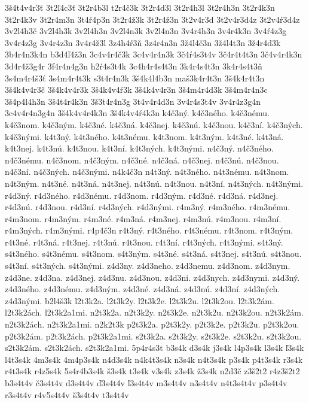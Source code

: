 {3š4t4v4r3ť
3t2ľ4c3ť
3t2r4b3l
t2r4č3k
3t2r4d3l
3t2r4h3l
3t2r4h3n
3t2r4k3n
3t2r4k3v
3t2r4m3n
3t4ŕ4p3n
3t2r4ž3k
3t2r4ž3n
3t2v4r3d
3t2v4r3d4z
3t2v4ŕ3d4z
3v2l4h3č
3v2l4h3k
3v2l4h3n
3v2l4n3k
3v2l4n3n
3v4r4h3n
3v4r4k3n
3v4ŕ4z3g
3v4r4z3g
3v4r4z3n
3v4r4ž3l
3z4h4ŕ3ň
3z4r4n3n
3ž4l4č3n
3ž4l4t3n
3ž4r4d3k
3b4r4n3k4n
b3d4ľ4ž3n
3c4v4r4č3k
3c4v4r4n3k
3č4ŕ4s3t4v
3č4r4t4t3n
3č4v4r4k3n
3d4r4ž3g4r
3f4r4n4g3n
h2ŕ4s3t4k
3c4h4r4s4t3n
3k4r4s4t3n
3k4r4s4t3ň
3s4m4r4š3ť
3s4m4r4t3k
s3t4r4n3k
3š4k4l4b3n
maš3k4r4t3n
3š4k4r4t3n
3š4k4v4r3č
3š4k4v4r3k
3š4k4v4ŕ3k
3š4k4v4r3n
3š4m4r4d3k
3š4m4r4n3c
3š4p4l4h3n
3š4t4r4k3n
3š3t4r4n3g
3t4v4r4d3n
3v4r4s3t4v
3v4r4z3g4n
3c4v4r4n3g4n
3š4k4v4r4k3n
3š4k4v4ŕ4k3n
k4č3ný.
k4č3ného.
k4č3nému.
k4č3nom.
k4č3ným.
k4č3né.
k4č3ná.
k4č3nej.
k4č3nú.
k4č3nou.
k4č3ní.
k4č3ných.
k4č3nými.
k4t3ný.
k4t3ného.
k4t3nému.
k4t3nom.
k4t3ným.
k4t3né.
k4t3ná.
k4t3nej.
k4t3nú.
k4t3nou.
k4t3ní.
k4t3ných.
k4t3nými.
n4č3ný.
n4č3ného.
n4č3nému.
n4č3nom.
n4č3ným.
n4č3né.
n4č3ná.
n4č3nej.
n4č3nú.
n4č3nou.
n4č3ní.
n4č3ných.
n4č3nými.
n4k4č3n
n4t3ný.
n4t3ného.
n4t3nému.
n4t3nom.
n4t3ným.
n4t3né.
n4t3ná.
n4t3nej.
n4t3nú.
n4t3nou.
n4t3ní.
n4t3ných.
n4t3nými.
r4d3ný.
r4d3ného.
r4d3nému.
r4d3nom.
r4d3ným.
r4d3né.
r4d3ná.
r4d3nej.
r4d3nú.
r4d3nou.
r4d3ní.
r4d3ných.
r4d3nými.
r4m3ný.
r4m3ného.
r4m3nému.
r4m3nom.
r4m3ným.
r4m3né.
r4m3ná.
r4m3nej.
r4m3nú.
r4m3nou.
r4m3ní.
r4m3ných.
r4m3nými.
r4p4č3n
r4t3ný.
r4t3ného.
r4t3nému.
r4t3nom.
r4t3ným.
r4t3né.
r4t3ná.
r4t3nej.
r4t3nú.
r4t3nou.
r4t3ní.
r4t3ných.
r4t3nými.
s4t3ný.
s4t3ného.
s4t3nému.
s4t3nom.
s4t3ným.
s4t3né.
s4t3ná.
s4t3nej.
s4t3nú.
s4t3nou.
s4t3ní.
s4t3ných.
s4t3nými.
z4d3ny.
z4d3neho.
z4d3nemu.
z4d3nom.
z4d3nym.
z4d3ne.
z4d3na.
z4d3nej.
z4d3nu.
z4d3nou.
z4d3ni.
z4d3nych.
z4d3nymi.
z4d3ný.
z4d3ného.
z4d3nému.
z4d3ným.
z4d3né.
z4d3ná.
z4d3nú.
z4d3ní.
z4d3ných.
z4d3nými.
b2l4š3k
l2t3k2a.
l2t3k2y.
l2t3k2e.
l2t3k2u.
l2t3k2ou.
l2t3k2ám.
l2t3k2ách.
l2t3k2a1mi.
n2t3k2a.
n2t3k2y.
n2t3k2e.
n2t3k2u.
n2t3k2ou.
n2t3k2ám.
n2t3k2ách.
n2t3k2a1mi.
n2k2t3k
p2t3k2a.
p2t3k2y.
p2t3k2e.
p2t3k2u.
p2t3k2ou.
p2t3k2ám.
p2t3k2ách.
p2t3k2a1mi.
s2t3k2a.
s2t3k2y.
s2t3k2e.
s2t3k2u.
s2t3k2ou.
s2t3k2ám.
s2t3k2ách.
s2t3k2a1mi.
5p4r4s3t
b3s4k
d3s4k
j3s4k
l4p3s4k
l3s4k
ľ3s4k
l4t3s4k
4m3s4k
4m4p3s4k
n4d3s4k
n4k4t3s4k
n3s4k
n4t3s4k
p3s4k
p4t3s4k
r3s4k
r4t3s4k
r4z5s4k
5s4r4b3s4k
š3s4k
t3s4k
v3s4k
z3s4k
ž3s4k
n2d3č
z3š2t2
r4z3š2t2
b3s4t4v
č3s4t4v
d3s4t4v
ď3s4t4v
ľ3s4t4v
m3s4t4v
n3s4t4v
n4t3s4t4v
p3s4t4v
r3s4t4v
r4v5s4t4v
š3s4t4v
t3s4t4v
}
